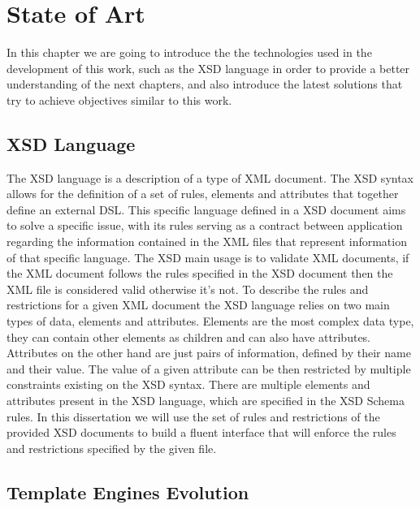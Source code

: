 \chapter{State of Art}
\label{cha:stateofart}

In this chapter we are going to introduce the the technologies used in the development of this work, such as the \ac{XSD} language in order to provide a better understanding of the next chapters, and also introduce the latest solutions that try to achieve objectives similar to this work. 

\section{XSD Language} %
\label{sec:xsd}

The \ac{XSD} language is a description of a type of \ac{XML} document. The \ac{XSD} syntax allows for the definition of a set of rules, elements and attributes that together define an external \ac{DSL}. This specific language defined in a \ac{XSD} document aims to solve a specific issue, with its rules serving as a contract between application regarding the information contained in the \ac{XML} files that represent information of that specific language. The \ac{XSD} main usage is to validate \ac{XML} documents, if the \ac{XML} document follows the rules specified in the \ac{XSD} document then the \ac{XML} file is considered valid otherwise it's not. To describe the rules and restrictions for a given \ac{XML} document the \ac{XSD} language relies on two main types of data, elements and attributes. Elements are the most complex data type, they can contain other elements as children and can also have attributes. Attributes on the other hand are just pairs of information, defined by their name and their value. The value of a given attribute can be then restricted by multiple constraints existing on the \ac{XSD} syntax. There are multiple elements and attributes present in the \ac{XSD} language, which are specified in the \ac{XSD} Schema rules\cite{xsdrules}. In this dissertation we will use the set of rules and restrictions of the provided \ac{XSD} documents to build a fluent interface that will enforce the rules and restrictions specified by the given file.

\section{Template Engines Evolution}
\label{sec:templateenginesevolution}

